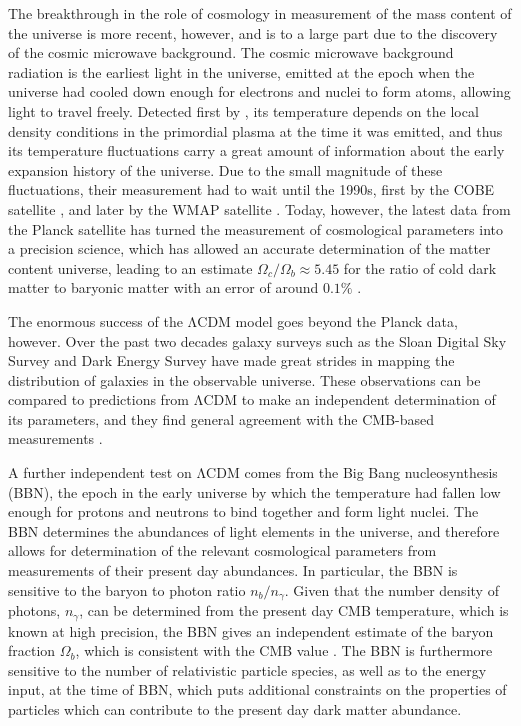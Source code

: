 \documentclass[b5paper, 10pt, twoside]{book}
\begin{document}
The breakthrough in the role of cosmology in measurement of the mass content of the universe is more recent, however, and is to a large part due to the discovery of the cosmic microwave background. The cosmic microwave background radiation is the earliest light in the universe, emitted at the epoch when the universe had cooled down enough for electrons and nuclei to form atoms, allowing light to travel freely. Detected first by \textcite{PenziasWilson1965}, its temperature depends on the local density conditions in the primordial plasma at the time it was emitted, and thus its temperature fluctuations carry a great amount of information about the early expansion history of the universe. Due to the small magnitude of these fluctuations, their measurement had to wait until the 1990s, first by the COBE satellite \parencite{BennettEtAl1996}, and later by the WMAP satellite \parencite{BennettEtAl2013}. Today, however, the latest data from the Planck satellite has turned the measurement of cosmological parameters into a precision science, which has allowed an accurate determination of the matter content universe, leading to an estimate $\Omega_c/\Omega_b\approx 5.45$ for the ratio of cold dark matter to baryonic matter with an error of around $0.1\%$ \parencite{Planck2018}.

The enormous success of the ΛCDM model goes beyond the Planck data, however. Over the past two decades galaxy surveys such as the Sloan Digital Sky Survey \parencite{SDSSIV2022} and Dark Energy Survey \parencite{DES2018} have made great strides in mapping the distribution of galaxies in the observable universe. These observations can be compared to predictions from ΛCDM to make an independent determination of its parameters, and they find general agreement with the CMB-based measurements \parencite{eBOSS2021}.

A further independent test on ΛCDM comes from the Big Bang nucleosynthesis (BBN), the epoch in the early universe by which the temperature had fallen low enough for protons and neutrons to bind together and form light nuclei. The BBN determines the abundances of light elements in the universe, and therefore allows for determination of the relevant cosmological parameters from measurements of their present day abundances. In particular, the BBN is sensitive to the baryon to photon ratio $n_b/n_\gamma$. Given that the number density of photons, $n_\gamma$, can be determined from the present day CMB temperature, which is known at high precision, the BBN gives an independent estimate of the baryon fraction $\Omega_b$, which is consistent with the CMB value \parencite{FieldsEtAl2020}. The BBN is furthermore sensitive to the number of relativistic particle species, as well as to the energy input, at the time of BBN, which puts additional constraints on the properties of particles which can contribute to the present day dark matter abundance.
\end{document}

